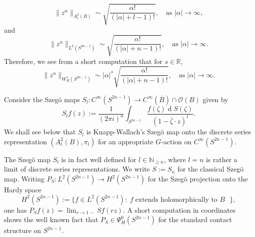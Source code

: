 \documentclass[a4paper,reqno]{amsart}
\numberwithin{equation}{section}
\def\rd{\operatorname{d}\!}
\def\R{\mathbb{R}}
\def\N{\mathbb{N}}
\theoremstyle{definition}
\theoremstyle{remark}
\begin{document}
\begin{equation}
\label{a2norm}
\|z^\alpha\|_{A^2_l(B)}\sim \sqrt{\frac{\alpha!}{(|\alpha|+l-1)!}},\quad \mbox{as $|\alpha|\to \infty$},
\end{equation}
and 
\begin{equation}
\label{l2normsp}
\|z^\alpha\|_{L^2(S^{2n-1})}\sim \sqrt{\frac{\alpha!}{(|\alpha|+n-1)!}},\quad \mbox{as $|\alpha|\to \infty$}.
\end{equation}
Therefore, we see from a short computation that for $s\in \R$,
\begin{equation}
\label{wshnorm}
\|z^\alpha\|_{W^s_H(S^{2n-1})}\sim |\alpha|^s\sqrt{\frac{\alpha!}{(|\alpha|+n-1)!}},\quad \mbox{as $|\alpha|\to \infty$}.
\end{equation}


Consider the Szegö maps $S_l:C^\infty(S^{2n-1})\to C^\infty(\overline{B})\cap \mathcal{O}(B)$ given by 
\begin{equation}
\label{szegosun}
S_lf(z):=\frac{1}{(2\pi i)^n}\int_{S^{2n-1}} \frac{f(\zeta)\rd S(\zeta)}{(1-\bar{\zeta}\cdot z)^l}.
\end{equation}
We shall see below that $S_l$ is Knapp-Wallach's Szegö map onto the discrete series representation $(A^2_l(B),\pi_l)$ for an appropriate $G$-action on $C^\infty(S^{2n-1})$. 

The Szegö map $S_l$ is in fact well defined for $l\in \N_{\geq n}$, where $l=n$ is rather a limit of discrete series representations. We write $S:=S_n$ for the classical Szegö map. Writing $P_S:L^2(S^{2n-1})\to H^2(S^{2n-1})$ for the Szegö projection onto the Hardy space 
$$H^2(S^{2n-1}):=\{f\in L^2(S^{2n-1}): \; f\; \mbox{extends holomorphically to $B$ }\},$$ 
one has $P_Sf(z)=\lim_{r\to 1-} Sf(rz)$. A short computation in coordinates shows the well known fact that $P_S\in \Psi^0_H(S^{2n-1})$ for the standard contact structure on $S^{2n-1}$. 
\end{document}
